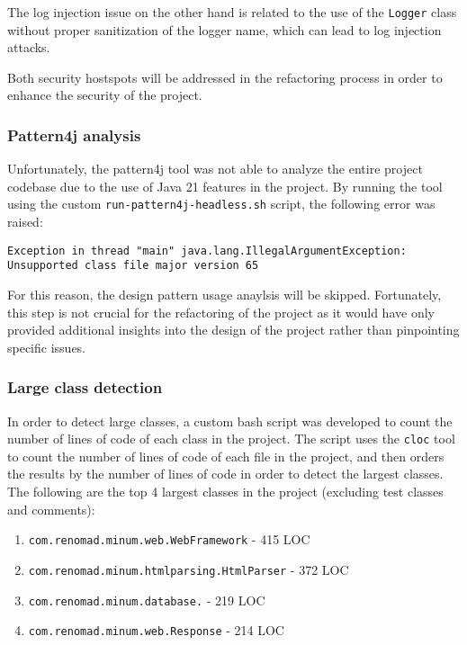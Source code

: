 The log injection issue on the other hand is related to the use of the \texttt{Logger} class without proper sanitization of the logger name, which can lead to log injection attacks.

Both security hostspots will be addressed in the refactoring process in order to enhance the security of the project.

\subsubsection{Pattern4j analysis}

Unfortunately, the pattern4j tool was not able to analyze the entire project codebase due to the use of Java 21 features in the project. By running the tool using the custom \texttt{run-pattern4j-headless.sh} script, the following error was raised:

\begin{verbatim}
Exception in thread "main" java.lang.IllegalArgumentException: Unsupported class file major version 65
\end{verbatim}

\noindent For this reason, the design pattern usage anaylsis will be skipped. Fortunately, this step is not crucial for the refactoring of the project as it would have only provided additional insights into the design of the project rather than pinpointing specific issues.

\subsubsection{Large class detection}

In order to detect large classes, a custom bash script was developed to count the number of lines of code of each class in the project. The script uses the \texttt{cloc} tool to count the number of lines of code of each file in the project, and then orders the results by the number of lines of code in order to detect the largest classes. The following are the top 4 largest classes in the project (excluding test classes and comments):

\begin{enumerate}
	\item \texttt{com.renomad.minum.web.WebFramework} - 415 LOC
	\item \texttt{com.renomad.minum.htmlparsing.HtmlParser} - 372 LOC
	\item \texttt{com.renomad.minum.database.} - 219 LOC
	\item \texttt{com.renomad.minum.web.Response} - 214 LOC
\end{enumerate}

